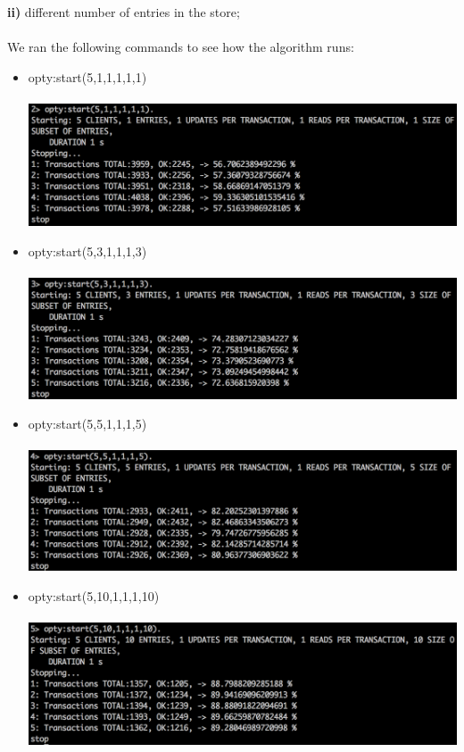 \documentclass[a4paper, 11pt]{article}
\begin{document}
%
\textbf{ii)} different number of entries in the store;\\\\
We ran the following commands to see how the algorithm runs:\\
\begin{itemize}
\item opty:start(5,1,1,1,1,1)\\\\
\includegraphics[scale=0.5]{images/exp-ii-1.png} \\
\item opty:start(5,3,1,1,1,3)\\\\
\includegraphics[scale=0.5]{images/exp-ii-2.png} \\
\item opty:start(5,5,1,1,1,5)\\\\
\includegraphics[scale=0.5]{images/exp-ii-3.png} \\
\item opty:start(5,10,1,1,1,10)\\\\
\includegraphics[scale=0.5]{images/exp-ii-4.png} \\

\end{itemize}
\end{document}
